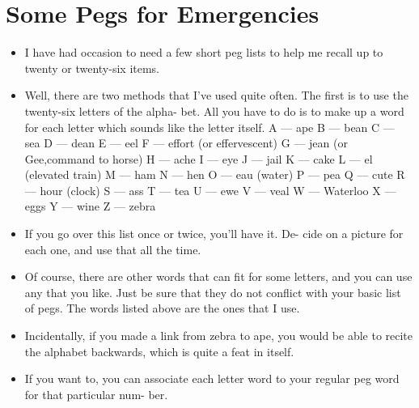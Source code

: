     \section*{Some Pegs for Emergencies}
        \begin{itemize}
            \item I have had occasion to need a few
            short peg lists to help me recall up to twenty or twenty-six
            items.
            \item Well, there are two methods that I've used quite
            often. The first is to use the twenty-six letters of the alpha-
            bet. All you have to do is to make up a word for each letter
            which sounds like the letter itself.
                \subitem A — ape
                \subitem B — bean
                \subitem C — sea
                \subitem D — dean
                \subitem E — eel
                \subitem F — effort (or effervescent)
                \subitem G — jean (or Gee,command to horse)
                \subitem H — ache
                \subitem I — eye
                \subitem J — jail
                \subitem K — cake
                \subitem L — el (elevated train)
                \subitem M — ham
                \subitem N — hen
                \subitem O — eau (water)
                \subitem P — pea
                \subitem Q — cute
                \subitem R — hour (clock)
                \subitem S — ass
                \subitem T — tea
                \subitem U — ewe
                \subitem V — veal
                \subitem W — Waterloo
                \subitem X — eggs
                \subitem Y — wine
                \subitem Z — zebra
            \item If you go over this list once or twice, you'll have it. De-
            cide on a picture for each one, and use that all the time.
            \item Of course, there are other words that can fit for some letters,
            and you can use any that you like. Just be sure that they
            do not conflict with your basic list of pegs. The words listed
            above are the ones that I use.
            \item Incidentally, if you made a link from zebra to ape, you
            would be able to recite the alphabet backwards, which is
            quite a feat in itself.
            \item If you want to, you can associate each
            letter word to your regular peg word for that particular num-
            ber.

\end{itemize}
